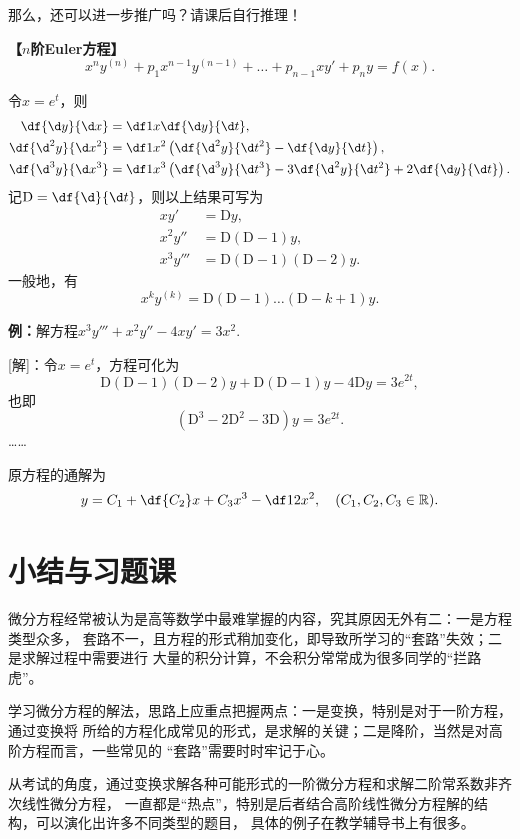 那么，还可以进一步推广吗？请课后自行推理！

\begin{shaded}
	{\bf 【$n$阶Euler方程】}
	$$x^ny^{(n)}+p_1x^{n-1}y^{(n-1)}+\ldots+p_{n-1}xy'
	+p_ny=f(x).$$
	
	令$x=e^t$，则
	\begin{align*}
		\df{\d y}{\d x}&=\df1x\df{\d y}{\d t},\\
		\df{\d^2 y}{\d x^2}&=\df1{x^2}\left(\df{\d^2 y}{\d t^2}
		-\df{\d y}{\d t}\right),\\
		\df{\d^3 y}{\d x^3}&=\df1{x^3}\left(\df{\d^3 y}{\d t^3}
		-3\df{\d^2 y}{\d t^2}+2\df{\d y}{\d t}\right).
	\end{align*}
	记$\mathrm{D}=\df{\d}{\d t}$，则以上结果可写为
	\begin{align*}
		xy'&=\mathrm{D}y,\\
		x^2y''&=\mathrm{D}(\mathrm{D}-1)y,\\
		x^3y'''&=\mathrm{D}(\mathrm{D}-1)(\mathrm{D}-2)y.
	\end{align*}
	一般地，有
	$$x^ky^{(k)}=\mathrm{D}(\mathrm{D}-1)\ldots(\mathrm{D}-k+1)y.$$
	
	{\bf 例：}解方程$x^3y'''+x^2y''-4xy'=3x^2$.
	
	[解]：令$x=e^t$，方程可化为
	$$\mathrm{D}(\mathrm{D}-1)(\mathrm{D}-2)y+\mathrm{D}(\mathrm{D}-1)y
	-4\mathrm{D}y=3e^{2t},$$
	也即
	$$(\mathrm{D}^3-2\mathrm{D}^2-3\mathrm{D})y=3e^{2t}.$$
	\ldots\ldots
	
	原方程的通解为
	$$y=C_1+\df{C_2}x+C_3x^3-\df12x^2,\quad(C_1,C_2,C_3\in\mathbb{R}).$$
\end{shaded}

\section{小结与习题课}

微分方程经常被认为是高等数学中最难掌握的内容，究其原因无外有二：一是方程类型众多，
套路不一，且方程的形式稍加变化，即导致所学习的“套路”失效；二是求解过程中需要进行
大量的积分计算，不会积分常常成为很多同学的“拦路虎”。

学习微分方程的解法，思路上应重点把握两点：一是变换，特别是对于一阶方程，通过变换将
所给的方程化成常见的形式，是求解的关键；二是降阶，当然是对高阶方程而言，一些常见的
“套路”需要时时牢记于心。

从考试的角度，通过变换求解各种可能形式的一阶微分方程和求解二阶常系数非齐次线性微分方程，
一直都是“热点”，特别是后者结合高阶线性微分方程解的结构，可以演化出许多不同类型的题目，
具体的例子在教学辅导书上有很多。

